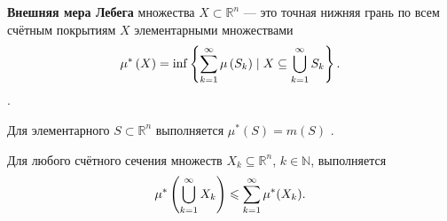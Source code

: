 
\begin{to_def}
    \textbf{Внешняя мера Лебега} множества $X \subset \mathbb{R}^n$ --- это точная нижняя грань по всем счётным покрытиям $X$ элементарными множествами
    $$
    \mu^* \left(X\right) = \inf \left\{
    \sum_{k=1}^{\infty} \mu \left(S_k\right) \mid X \subseteq  \bigcup_{k=1}^{\infty} S_k
    \right\}.
    $$.
\end{to_def}

\begin{to_lem}
\label{lem5.9}
    Для элементарного $S \subset \mathbb{R}^n$ выполняется $\mu^* (S) = m (S)$ .
\end{to_lem}

\begin{to_lem}
\label{lem5.10}
    Для любого счётного сечения множеств $X_k \subseteq \mathbb{R}^n$, $k \in \mathbb{N}$, выполняется 
    $$
        \mu^* \left(\bigcup_{k=1}^{\infty} X_k\right) \leqslant \sum_{k=1}^{\infty} \mu^* (X_k).
    $$
\end{to_lem}

